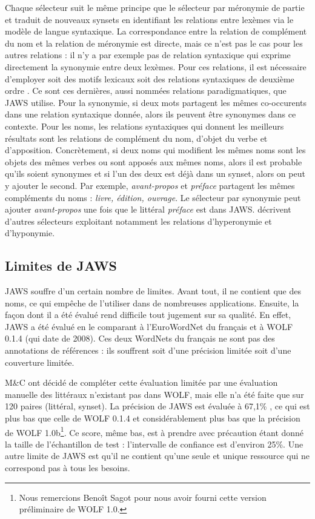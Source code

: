 Chaque sélecteur suit le même principe que le sélecteur par méronymie de partie et traduit de nouveaux synsets en identifiant les relations entre lexèmes via le modèle de langue syntaxique. La correspondance entre la relation de complément du nom et la relation de méronymie est directe, mais ce n'est pas le cas pour les autres relations : il n'y a par exemple pas de relation syntaxique qui exprime directement la synonymie entre deux lexèmes. Pour ces relations, il est nécessaire d'employer soit des motifs lexicaux \citep{hearst1992automatic} soit des relations syntaxiques de deuxième ordre \citep{lenci2012identifying}. Ce sont ces dernières, aussi nommées relations paradigmatiques, que JAWS utilise. Pour la synonymie, si deux mots partagent les mêmes co-occurents dans une relation syntaxique donnée, alors ils peuvent être synonymes dans ce contexte. Pour les noms, les relations syntaxiques qui donnent les meilleurs résultats sont les relations de complément du nom, d'objet du verbe et d'apposition. Concrètement, si deux noms qui modifient les mêmes noms sont les objets des mêmes verbes ou sont apposés aux mêmes noms, alors il est probable qu'ils soient synonymes et si l'un des deux est déjà dans un synset, alors on peut y ajouter le second. Par exemple, \textit{avant-propos} et \textit{préface} partagent les mêmes compléments du noms : \textit{livre, édition, ouvrage}. Le sélecteur par synonymie peut ajouter \textit{avant-propos} une fois que le littéral \textit{préface} est dans JAWS. \citep{MoutonChalendar2010,mouton2011phd} décrivent d'autres sélecteurs exploitant notamment les relations d'hyperonymie et d'hyponymie.

\subsection{Limites de JAWS}
\label{subsec:limitations}

JAWS souffre d'un certain nombre de limites. Avant tout, il ne contient que des noms, ce qui empêche de l'utiliser dans de nombreuses applications. Ensuite, la façon dont il a été évalué rend difficile tout jugement sur sa qualité. En effet, JAWS a été évalué en le comparant à l'EuroWordNet du français et à WOLF 0.1.4 (qui date de 2008). Ces deux WordNets du français ne sont pas des annotations de références : ils souffrent soit d'une précision limitée soit d'une couverture limitée.

M\&C ont décidé de compléter cette évaluation limitée par une évaluation manuelle des littéraux n'existant pas dans WOLF, mais elle n'a été faite que sur 120 paires (littéral, synset). La précision de JAWS est évaluée à 67,1\% \citep{mouton2011phd}, ce qui est plus bas que celle de WOLF 0.1.4 et considérablement plus bas que la précision de WOLF 1.0b\footnote{Nous remercions Benoît Sagot pour nous avoir fourni cette version préliminaire de WOLF 1.0.}. Ce score, même bas, est à prendre avec précaution étant donné la taille de l'échantillon de test : l'intervalle de confiance est d'environ 25\%. Une autre limite de JAWS est qu'il ne contient qu'une seule et unique ressource qui ne correspond pas à tous les besoins.

